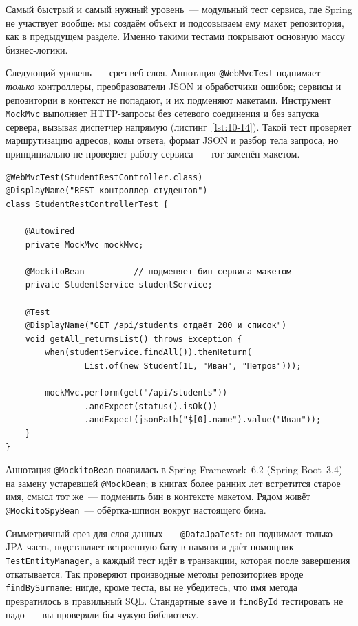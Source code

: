 Самый быстрый и самый нужный уровень~--- модульный тест сервиса, где Spring не участвует вообще: мы создаём объект и подсовываем ему макет репозитория, как в предыдущем разделе. Именно такими тестами покрывают основную массу бизнес-логики.

Следующий уровень~--- срез веб-слоя. Аннотация \texttt{@WebMvcTest} поднимает \emph{только} контроллеры, преобразователи JSON и обработчики ошибок; сервисы и репозитории в контекст не попадают, и их подменяют макетами. Инструмент \texttt{MockMvc} выполняет HTTP-запросы без сетевого соединения и без запуска сервера, вызывая диспетчер напрямую (листинг~\ref{lst:10-14}). Такой тест проверяет маршрутизацию адресов, коды ответа, формат JSON и разбор тела запроса, но принципиально не проверяет работу сервиса~--- тот заменён макетом.

\begin{listing}[H]
\begin{verbatim}
@WebMvcTest(StudentRestController.class)
@DisplayName("REST-контроллер студентов")
class StudentRestControllerTest {

    @Autowired
    private MockMvc mockMvc;

    @MockitoBean          // подменяет бин сервиса макетом
    private StudentService studentService;

    @Test
    @DisplayName("GET /api/students отдаёт 200 и список")
    void getAll_returnsList() throws Exception {
        when(studentService.findAll()).thenReturn(
                List.of(new Student(1L, "Иван", "Петров")));

        mockMvc.perform(get("/api/students"))
                .andExpect(status().isOk())
                .andExpect(jsonPath("$[0].name").value("Иван"));
    }
}
\end{verbatim}
\caption{Срез веб-слоя: @WebMvcTest и MockMvc}
\label{lst:10-14}
\end{listing}

Аннотация \texttt{@MockitoBean} появилась в Spring Framework~6.2 (Spring Boot~3.4) на замену устаревшей \texttt{@MockBean}; в книгах более ранних лет встретится старое имя, смысл тот же~--- подменить бин в контексте макетом. Рядом живёт \texttt{@MockitoSpyBean}~--- обёртка-шпион вокруг настоящего бина.

Симметричный срез для слоя данных~--- \texttt{@DataJpaTest}: он поднимает только JPA-часть, подставляет встроенную базу в памяти и даёт помощник \texttt{TestEntityManager}, а каждый тест идёт в транзакции, которая после завершения откатывается. Так проверяют производные методы репозиториев вроде \texttt{findBySurname}: нигде, кроме теста, вы не убедитесь, что имя метода превратилось в правильный SQL. Стандартные \texttt{save} и \texttt{findById} тестировать не надо~--- вы проверяли бы чужую библиотеку.

